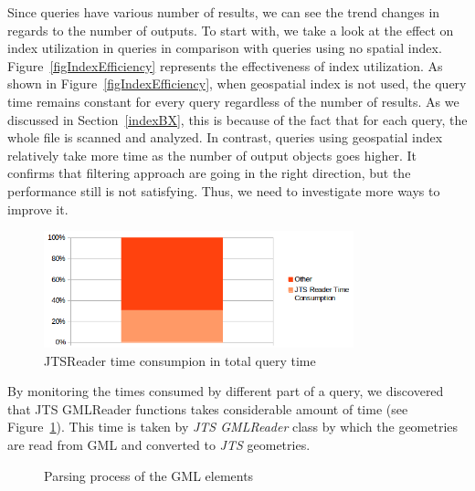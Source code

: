 \documentclass[a4paper,12pt]{article}
\begin{document}
Since queries have various number of results, we can see the trend changes in regards to the number of outputs.
To start with, we take a look at the effect on index utilization in queries in comparison with queries using no spatial index. Figure~\ref{figIndexEfficiency} represents the effectiveness of index utilization.
As shown in Figure~\ref{figIndexEfficiency}, when geospatial index is not used, the query time remains constant for every query regardless of the number of results. As we discussed in Section~\ref{indexBX}, this is because of the fact that for each query, the whole file is scanned and analyzed. In contrast, queries using geospatial index relatively take more time as the number of output objects goes higher. It confirms that filtering approach are going in the right direction, but the performance still is not satisfying. Thus, we need to investigate more ways to improve it.
\begin{figure}
\centering
\includegraphics[width=0.8\textwidth]{JTSReadetTimeConsumption}
\caption{JTSReader time consumpion in total query time}
\label{figJTSReaderTime}
\end{figure}
By monitoring the times consumed by different part of a query, we discovered that JTS GMLReader functions takes considerable amount of time (see Figure~\ref{figJTSReaderTime}). This time is taken by \textit{JTS GMLReader} class by which the geometries are read from GML and converted to \textit{JTS} geometries. 

\begin{figure}
\centering
{}
\centering
{}
\caption{Parsing process of the GML elements}
\label{figParseProcess}
\end{figure}
\end{document}
